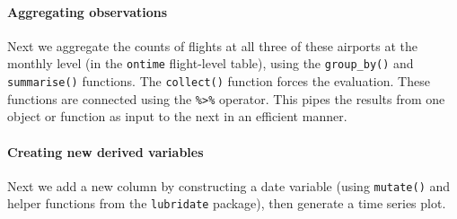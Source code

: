 \documentclass[]{article}
\newenvironment{Shaded}{\begin{snugshade}}{\end{snugshade}}
\newcommand{\KeywordTok}[1]{\textcolor[rgb]{0.13,0.29,0.53}{\textbf{{#1}}}}
\newcommand{\DataTypeTok}[1]{\textcolor[rgb]{0.13,0.29,0.53}{{#1}}}
\newcommand{\StringTok}[1]{\textcolor[rgb]{0.31,0.60,0.02}{{#1}}}
\newcommand{\CommentTok}[1]{\textcolor[rgb]{0.56,0.35,0.01}{\textit{{#1}}}}
\newcommand{\NormalTok}[1]{{#1}}
\begin{document}
\paragraph{Aggregating observations}\label{aggregating-observations}

Next we aggregate the counts of flights at all three of these airports
at the monthly level (in the \texttt{ontime} flight-level table), using
the \texttt{group\_by()} and \texttt{summarise()} functions. The
\texttt{collect()} function forces the evaluation. These functions are
connected using the \texttt{\%\textgreater{}\%} operator. This pipes the
results from one object or function as input to the next in an efficient
manner.

\begin{Shaded}
\end{Shaded}

\paragraph{Creating new derived
variables}\label{creating-new-derived-variables}

Next we add a new column by constructing a date variable (using
\texttt{mutate()} and helper functions from the \texttt{lubridate}
package), then generate a time series plot.

\begin{Shaded}
\end{Shaded}
\end{document}
